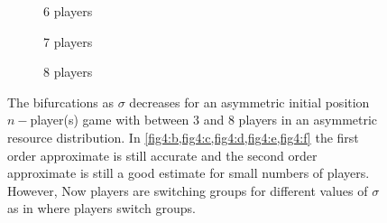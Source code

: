 \documentclass{article}
\begin{document}
\begin{figure}[ht!]
                    
                    \begin{subfigure}[b]{0.3\linewidth}
                        \centering
                         
                        \caption{6 players }  
                        \label{fig4:e} 
                        \vspace{4ex}
                    \end{subfigure}
                    \begin{subfigure}[b]{0.3\linewidth}
                        \centering
                         
                        \caption{7 players} 
                        \label{fig4:f} 
                        \vspace{4ex}
                    \end{subfigure}
                    \begin{subfigure}[b]{0.3\linewidth}
                        \centering
                         
                        \caption{8 players } 
                        \label{fig4:g}
                        \vspace{4ex}
                    \end{subfigure} 
                    \caption{The bifurcations as $\sigma$ decreases for an asymmetric initial position $n-$player(s) game with between 3 and 8 players in an asymmetric resource distribution. In \cref{fig4:b,fig4:c,fig4:d,fig4:e,fig4:f} the first order approximate is still accurate and the second order approximate is still a good estimate for small numbers of players. However, Now players are switching groups for different values of $\sigma$ as in   where players switch groups.}
                    \label{fig4} 
                \end{figure}
                \clearpage
\end{document}
